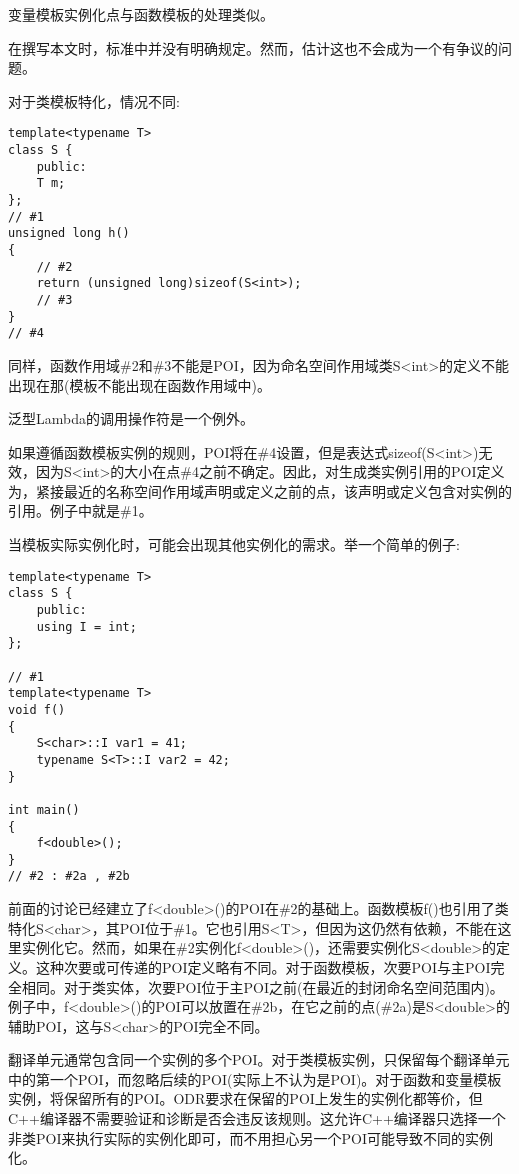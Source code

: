 变量模板实例化点与函数模板的处理类似。

\begin{tcolorbox}[colback=webgreen!5!white,colframe=webgreen!75!black]
\hspace*{0.75cm}在撰写本文时，标准中并没有明确规定。然而，估计这也不会成为一个有争议的问题。
\end{tcolorbox}

对于类模板特化，情况不同:

\begin{lstlisting}[style=styleCXX]
template<typename T>
class S {
	public:
	T m;
};
// #1
unsigned long h()
{
	// #2
	return (unsigned long)sizeof(S<int>);
	// #3
}
// #4
\end{lstlisting}

同样，函数作用域\#2和\#3不能是POI，因为命名空间作用域类S<int>的定义不能出现在那(模板不能出现在函数作用域中)。

\begin{tcolorbox}[colback=webgreen!5!white,colframe=webgreen!75!black]
\hspace*{0.75cm}泛型Lambda的调用操作符是一个例外。
\end{tcolorbox}

如果遵循函数模板实例的规则，POI将在\#4设置，但是表达式sizeof(S<int>)无效，因为S<int>的大小在点\#4之前不确定。因此，对生成类实例引用的POI定义为，紧接最近的名称空间作用域声明或定义之前的点，该声明或定义包含对实例的引用。例子中就是\#1。

当模板实际实例化时，可能会出现其他实例化的需求。举一个简单的例子:

\begin{lstlisting}[style=styleCXX]
template<typename T>
class S {
	public:
	using I = int;
};

// #1
template<typename T>
void f()
{
	S<char>::I var1 = 41;
	typename S<T>::I var2 = 42;
}

int main()
{
	f<double>();
}
// #2 : #2a , #2b
\end{lstlisting}

前面的讨论已经建立了f<double>()的POI在\#2的基础上。函数模板f()也引用了类特化S<char>，其POI位于\#1。它也引用S<T>，但因为这仍然有依赖，不能在这里实例化它。然而，如果在\#2实例化f<double>()，还需要实例化S<double>的定义。这种次要或可传递的POI定义略有不同。对于函数模板，次要POI与主POI完全相同。对于类实体，次要POI位于主POI之前(在最近的封闭命名空间范围内)。例子中，f<double>()的POI可以放置在\#2b，在它之前的点(\#2a)是S<double>的辅助POI，这与S<char>的POI完全不同。

翻译单元通常包含同一个实例的多个POI。对于类模板实例，只保留每个翻译单元中的第一个POI，而忽略后续的POI(实际上不认为是POI)。对于函数和变量模板实例，将保留所有的POI。ODR要求在保留的POI上发生的实例化都等价，但C++编译器不需要验证和诊断是否会违反该规则。这允许C++编译器只选择一个非类POI来执行实际的实例化即可，而不用担心另一个POI可能导致不同的实例化。

